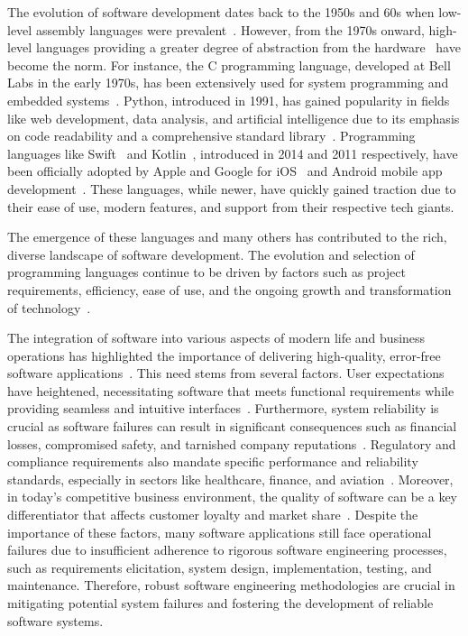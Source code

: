 The evolution of software development dates back to the 1950s and 60s when low-level assembly
languages were prevalent~\cite{lehman2002software}. However, from the 1970s onward, high-level
languages providing a greater degree of abstraction from the hardware~\cite{WhatisHa66:online}
have become the norm. For instance, the C programming language, developed at Bell Labs in the
early 1970s, has been extensively used for system programming and embedded systems~\cite{kernighan2002c}.
Python, introduced in 1991, has gained popularity in fields like web development,
data analysis, and artificial intelligence due to its emphasis on code readability and a
comprehensive standard library~\cite{van2007python}. Programming languages like
Swift~\cite{rebouccas2016empirical} and Kotlin~\cite{samuel2017programming},
introduced in 2014 and 2011 respectively, have been officially adopted by Apple and Google
for iOS~\cite{WhatIsSw25:online} and Android mobile app development~\cite{WhatIsKo37:online}.
These languages, while newer, have quickly gained traction due to their ease of use,
modern features, and support from their respective tech giants.

The emergence of these languages and many others has contributed to the rich,
diverse landscape of software development. The evolution and selection of programming
languages continue to be driven by factors such as project requirements,
efficiency, ease of use, and the ongoing growth and transformation of
technology~\cite{goosen2008brief}.

The integration of software into various aspects of modern life and business operations
has highlighted the importance of delivering high-quality, error-free software
applications~\cite{kahn2002information}. This need stems from several factors.
User expectations have heightened, necessitating software that meets functional
requirements while providing seamless and intuitive interfaces~\cite{ryker1997determinants}.
Furthermore, system reliability is crucial as software failures can result in significant
consequences such as financial losses, compromised safety, and
tarnished company reputations~\cite{pham2007system}.
Regulatory and compliance requirements also mandate specific performance and reliability standards,
especially in sectors like healthcare, finance, and aviation~\cite{mishra2022cybersecurity}. Moreover,
in today's competitive business environment, the quality of software can be a key differentiator
that affects customer loyalty and market share~\cite{rust1993customer}. Despite the importance of these
factors, many software applications still face operational failures due to insufficient adherence to
rigorous software engineering processes, such as requirements elicitation, system design,
implementation, testing, and maintenance. Therefore, robust software engineering methodologies are
crucial in mitigating potential system failures and fostering the development of reliable
software systems.

